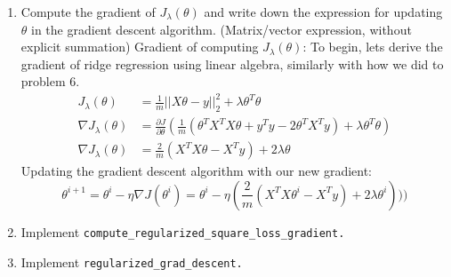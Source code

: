 \documentclass{article}
\begin{document}
\begin{enumerate}
\setcounter{enumi}{\value{saveenum}}
\item Compute the gradient of $J_\lambda(\theta)$ and write down the expression
for updating $\theta$ in the gradient descent algorithm. (Matrix/vector
expression, without explicit summation)
\subitem 
Gradient of computing $J_\lambda(\theta)$:
To begin, lets derive the gradient of ridge regression using linear algebra, similarly with how we did to problem 6.
\begin{equation}
    \begin{split}
        J_\lambda(\theta) &= \frac{1}{m} ||X\theta - y||_2^2 + \lambda \theta^T\theta \\
        \nabla J_\lambda(\theta) &= \frac{\partial J}{\partial \theta} (\frac{1}{m}(\theta^TX^TX\theta + y^Ty - 2\theta^TX^Ty) + \lambda \theta^T\theta) \\ 
        \nabla J_\lambda(\theta) &= \frac{2}{m} (X^TX\theta - X^Ty) + 2\lambda \theta
    \end{split}
\end{equation}
Updating the gradient descent algorithm with our new gradient:
$$\theta^{i+1} = \theta^i - \eta \nabla J(\theta^i) = \theta^i - \eta (\frac{2}{m} (X^TX\theta^i - X^Ty) + 2\lambda \theta^i)))$$
\item Implement \texttt{compute\_regularized\_square\_loss\_gradient.}
\item Implement \texttt{regularized\_grad\_descent.}
\setcounter{saveenum}{\value{enumi}}
\end{enumerate}
\end{document}
